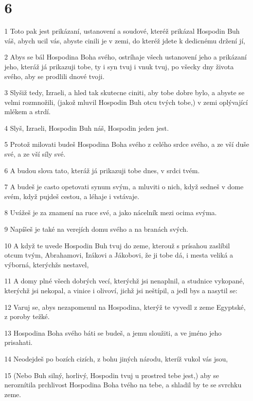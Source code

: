 \chapter{6}

\par 1 Toto pak jest prikázaní, ustanovení a soudové, kteréž prikázal Hospodin Buh váš, abych ucil vás, abyste cinili je v zemi, do kteréž jdete k dedicnému držení jí,
\par 2 Abys se bál Hospodina Boha svého, ostríhaje všech ustanovení jeho a prikázaní jeho, kteráž já prikazuji tobe, ty i syn tvuj i vnuk tvuj, po všecky dny života svého, aby se prodlili dnové tvoji.
\par 3 Slyšiž tedy, Izraeli, a hled tak skutecne ciniti, aby tobe dobre bylo, a abyste se velmi rozmnožili, (jakož mluvil Hospodin Buh otcu tvých tobe,) v zemi oplývající mlékem a strdí.
\par 4 Slyš, Izraeli, Hospodin Buh náš, Hospodin jeden jest.
\par 5 Protož milovati budeš Hospodina Boha svého z celého srdce svého, a ze vší duše své, a ze vší síly své.
\par 6 A budou slova tato, kteráž já prikazuji tobe dnes, v srdci tvém.
\par 7 A budeš je casto opetovati synum svým, a mluviti o nich, když sedneš v dome svém, když pujdeš cestou, a léhaje i vstávaje.
\par 8 Uvážeš je za znamení na ruce své, a jako nácelník mezi ocima svýma.
\par 9 Napíšeš je také na verejích domu svého a na branách svých.
\par 10 A když te uvede Hospodin Buh tvuj do zeme, kterouž s prísahou zaslíbil otcum tvým, Abrahamovi, Izákovi a Jákobovi, že ji tobe dá, i mesta veliká a výborná, kterýchžs nestavel,
\par 11 A domy plné všech dobrých vecí, kterýchž jsi nenaplnil, a studnice vykopané, kterýchž jsi nekopal, a vinice i olivoví, jichž jsi neštípil, a jedl bys a nasytil se:
\par 12 Varuj se, abys nezapomenul na Hospodina, kterýž te vyvedl z zeme Egyptské, z poroby težké.
\par 13 Hospodina Boha svého báti se budeš, a jemu sloužiti, a ve jméno jeho prisahati.
\par 14 Neodejdeš po bozích cizích, z bohu jiných národu, kteríž vukol vás jsou,
\par 15 (Nebo Buh silný, horlivý, Hospodin tvuj u prostred tebe jest,) aby se neroznítila prchlivost Hospodina Boha tvého na tebe, a shladil by te se svrchku zeme.

